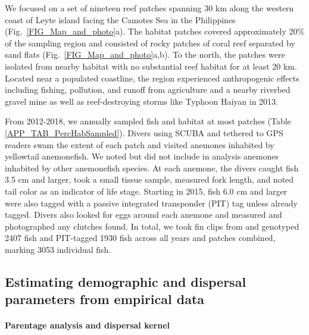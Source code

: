 \documentclass[12pt, oneside]{article}   	%
\begin{document}
We focused on a set of nineteen reef patches spanning 30 km along the western coast of Leyte island facing the Camotes Sea in the Philippines (Fig.\ \ref{FIG_Map_and_photo}a). The habitat patches covered approximately 20\% of the sampling region and consisted of rocky patches of coral reef separated by sand flats (Fig.\ \ref{FIG_Map_and_photo}a,b). To the north, the patches were isolated from nearby habitat with no substantial reef habitat for at least 20 km. Located near a populated coastline, the region experienced anthropogenic effects including fishing, pollution, and runoff from agriculture and a nearby riverbed gravel mine as well as reef-destroying storms like Typhoon Haiyan in 2013.%

From 2012-2018, we annually sampled fish and habitat at most patches (Table \ref{APP_TAB_PercHabSampled}). Divers using SCUBA and tethered to GPS readers swam the extent of each patch and visited anemones inhabited by yellowtail anemonefish. We noted but did not include in analysis anemones inhabited by other anemonefish species. At each anemone, the divers caught fish 3.5 cm and larger, took a small tissue sample, measured fork length, and noted tail color as an indicator of life stage. Starting in 2015, fish 6.0 cm and larger were also tagged with a passive integrated transponder (PIT) tag unless already tagged. Divers also looked for eggs around each anemone and measured and photographed any clutches found. In total, we took fin clips from and genotyped 2407 fish and PIT-tagged 1930 fish across all years and patches combined, marking 3053 individual fish. %

\subsection*{Estimating demographic and dispersal parameters from empirical data} 

\paragraph*{Parentage analysis and dispersal kernel}  %
\end{document}
